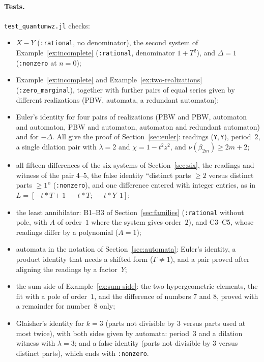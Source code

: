 \documentclass[11pt,a4paper]{article}
\newcommand{\val}{\nu}
\theoremstyle{plain}
\theoremstyle{definition}
\theoremstyle{remark}
\begin{document}
\paragraph{Tests.} \texttt{test\_quantumwz.jl} checks:
\begin{itemize}
\item $X-Y$ (\texttt{:rational}, no denominator), the second system of
  Example~\ref{ex:incomplete} (\texttt{:rational}, denominator $1+T^2$), and
  $\Delta=1$ (\texttt{:nonzero} at $n=0$);
\item Example~\ref{ex:incomplete} and Example~\ref{ex:two-realizations}
  (\texttt{:zero\_marginal}), together with further pairs of equal series given
  by different realizations (PBW, automata, a redundant automaton);
\item Euler's identity for four pairs of realizations (PBW and PBW, automaton
  and automaton, PBW and automaton, automaton and redundant automaton) and for
  $-\Delta$. All give the proof of Section~\ref{sec:euler}: readings
  (\texttt{Y},\,\texttt{Y}), period~$2$, a single dilation pair with $\lambda=2$
  and $\chi=1-t^2z^2$, and $\val(\beta_{2m})\ge2m+2$;
\item all fifteen differences of the six systems of Section~\ref{sec:six}, the
  readings and witness of the pair 4--5, the false identity ``distinct parts
  $\ge2$ versus distinct parts $\ge1$'' (\texttt{:nonzero}), and one difference
  entered with integer entries, as in $L=[-t*T+1\ \ -t*T;\ -t*Y\ \ 1]$;
\item the least annihilator: B1--B3 of Section~\ref{sec:families}
  (\texttt{:rational} without pole, with $A$ of order~$1$ where the system gives
  order~$2$), and C3--C5, whose readings differ by a polynomial ($A=1$);
\item automata in the notation of Section~\ref{sec:automata}: Euler's identity,
  a product identity that needs a shifted form ($\Gamma\ne1$), and a pair
  proved after aligning the readings by a factor~$Y$;
\item the sum side of Example~\ref{ex:sum-side}: the two hypergeometric elements,
  the fit with a pole of order~$1$, and the difference of numbers $7$ and $8$,
  proved with a remainder for number~$8$ only;
\item Glaisher's identity for $k=3$ (parts not divisible by $3$ versus parts
  used at most twice), with both sides given by automata: period~$3$ and a
  dilation witness with $\lambda=3$; and a false identity (parts not divisible by
  $3$ versus distinct parts), which ends with \texttt{:nonzero}.
\end{itemize}
\end{document}
